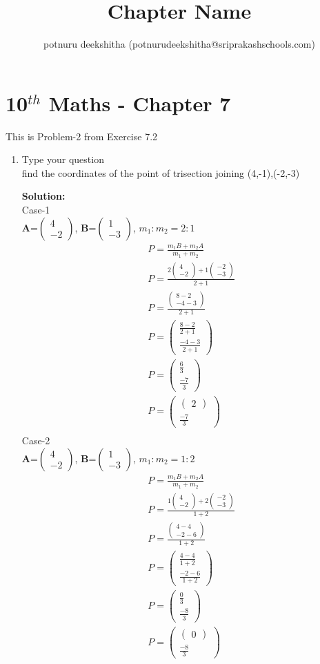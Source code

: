 \documentclass[12pt]{article}
\title{Chapter Name}
\author{potnuru deekshitha (potnurudeekshitha@sriprakashschools.com)}
\newcommand{\myvec}[1]{\ensuremath{\begin{pmatrix}#1\end{pmatrix}}}
\newcommand{\solution}{\noindent \textbf{Solution: }}
\let\vec\mathbf
\begin{document}
\maketitle
\section*{10$^{th}$ Maths - Chapter 7}
This is Problem-2 from Exercise 7.2
\begin{enumerate}
\item Type your question \\ find the coordinates of the point of trisection joining (4,-1),(-2,-3)

\solution\\
Case-1\\
$\vec{A}$=\myvec{4\\-2}, $\vec{B}$=\myvec{1\\-3},
$m_1:m_2=2:1$
\begin{align}
&P=\frac{m_1B+m_2A}{m_1+m_2}\\
&P=\frac{2\myvec{4\\-2}+1\myvec{-2\\-3}}{2+1}\\
&P=\frac{\myvec{8-2\\-4-3}}{2+1}\\
&P=\myvec{\frac{8-2}{2+1}\\\frac{-4-3}{2+1}}\\
&P=\myvec{\frac{6}{3}\\\frac{-7}{3}}\\
&P=\myvec{\myvec{2}\\\frac{-7}{3}}\\
\end{align}
Case-2\\
$\vec{A}$=\myvec{4\\-2}, $\vec{B}$=\myvec{1\\-3},
$m_1:m_2=1:2$
\begin{align}
&P=\frac{m_1B+m_2A}{m_1+m_2}\\
&P=\frac{1\myvec{4\\-2}+2\myvec{-2\\-3}}{1+2}\\
&P=\frac{\myvec{4-4\\-2-6}}{1+2}\\
&P=\myvec{\frac{4-4}{1+2}\\\frac{-2-6}{1+2}}\\
&P=\myvec{\frac{0}{3}\\\frac{-8}{3}}\\
&P=\myvec{\myvec{0}\\\frac{-8}{3}}\\
\end{align}



\end{enumerate}
\end{document}

